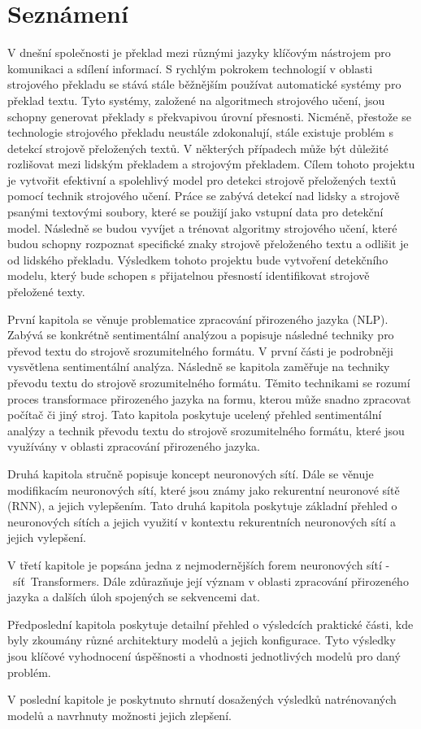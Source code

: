 \chapter{Seznámení}\label{sec:Introduction}
V dnešní společnosti je překlad mezi různými jazyky klíčovým nástrojem pro komunikaci a sdílení informací.
S rychlým pokrokem technologií v oblasti strojového překladu se stává stále běžnějším používat automatické systémy pro překlad textu.
Tyto systémy, založené na algoritmech strojového učení, jsou schopny generovat překlady s překvapivou úrovní přesnosti.
Nicméně, přestože se technologie strojového překladu neustále zdokonalují, stále existuje problém s detekcí strojově přeložených textů.
V některých případech může být důležité rozlišovat mezi lidským překladem a strojovým překladem.
Cílem tohoto projektu je vytvořit efektivní a spolehlivý model pro detekci strojově přeložených textů pomocí technik strojového učení.
Práce se zabývá detekcí nad lidsky a strojově psanými textovými soubory, které se použijí jako vstupní data pro detekční model.
Následně se budou vyvíjet a trénovat algoritmy strojového učení, které budou schopny rozpoznat specifické znaky strojově přeloženého textu a odlišit je od lidského překladu.
Výsledkem tohoto projektu bude vytvoření detekčního modelu, který bude schopen s přijatelnou přesností identifikovat strojově přeložené texty.

První kapitola se věnuje problematice zpracování přirozeného jazyka (NLP). Zabývá se konkrétně sentimentální analýzou a popisuje následné techniky pro převod textu do strojově srozumitelného formátu.
V první části je podrobněji vysvětlena sentimentální analýza. Následně se kapitola zaměřuje na techniky převodu textu do strojově srozumitelného formátu. Těmito technikami se rozumí proces transformace přirozeného jazyka na formu, kterou může snadno zpracovat počítač či jiný stroj.
Tato kapitola poskytuje ucelený přehled sentimentální analýzy a technik převodu textu do strojově srozumitelného formátu, které jsou využívány v oblasti zpracování přirozeného jazyka.

Druhá kapitola stručně popisuje koncept neuronových sítí. Dále se věnuje modifikacím neuronových sítí, které jsou známy jako rekurentní neuronové sítě (RNN), a jejich vylepšením.
Tato druhá kapitola poskytuje základní přehled o neuronových sítích a jejich využití v kontextu rekurentních neuronových sítí a jejich vylepšení.

V třetí kapitole je popsána jedna z nejmodernějších forem neuronových sítí -~síť~Transformers.
Dále zdůrazňuje její význam v oblasti zpracování přirozeného jazyka a dalších úloh spojených se sekvencemi dat.

Předposlední kapitola poskytuje detailní přehled o výsledcích praktické části, kde byly zkoumány různé architektury modelů a jejich konfigurace. Tyto výsledky jsou klíčové vyhodnocení úspěšnosti a vhodnosti jednotlivých modelů pro daný problém.

V poslední kapitole je poskytnuto shrnutí dosažených výsledků natrénovaných modelů a navrhnuty možnosti jejich zlepšení.

\endinput